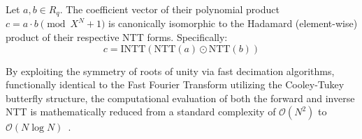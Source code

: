 \begin{theorem}
    Let $a, b \in R_q$. The coefficient vector of their polynomial product $c = a \cdot b \pmod{X^N+1}$ is canonically isomorphic to the Hadamard (element-wise) product of their respective NTT forms. Specifically:
    \begin{equation}
        c = \text{INTT}(\text{NTT}(a) \odot \text{NTT}(b))
    \end{equation}
    
    By exploiting the symmetry of roots of unity via fast decimation algorithms, functionally identical to the Fast Fourier Transform utilizing the Cooley-Tukey butterfly structure, the computational evaluation of both the forward and inverse NTT is mathematically reduced from a standard complexity of $\mathcal{O}(N^2)$ to $\mathcal{O}(N \log N)$~\cite{liang:2022}. %
\end{theorem}